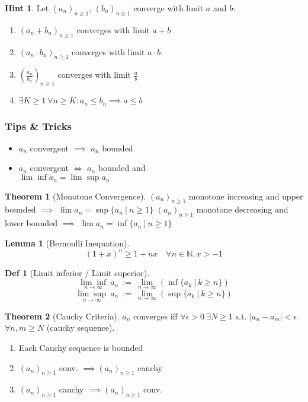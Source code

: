 \documentclass[a4paper, 10pt]{article}
\newtheorem*{lemma}{Lemma}
\theoremstyle{definition}
\newtheorem*{definition}{Def}
\newtheorem*{note_wrapper}{Hint}
\theoremstyle{named}
\newtheorem*{ntheorem_wrapper}{Theorem}
\newenvironment{ntheorem}%
    {\begin{mdframed}[style=important]\begin{ntheorem_wrapper}}%
    {\end{ntheorem_wrapper}\end{mdframed}}
\newenvironment{note}%
    {\begin{mdframed}[style=trick]\begin{note_wrapper}}%
    {\end{note_wrapper}\end{mdframed}}
\newcommand{\N}{\mathbb{N}}
\begin{document}
\begin{note}
    Let $(a_n)_{n\geq1}$, $(b_n)_{n\geq1}$ converge with limit $a$ and $b$:
    \begin{enumerate}
        \item $(a_n + b_n)_{n\geq1}$ converges with limit $a + b$
        \item $(a_n \cdot b_n)_{n\geq1}$ converges with limit $a \cdot b$.
        \item $(\frac{a_n}{b_n})_{n\geq1}$ converges with limit $\frac{a}{b}$
        \item $\exists K \geq 1 \ \forall n \geq K: a_n \leq b_n \implies a \leq b$
    \end{enumerate}
\end{note}

\subsubsection{Tips \& Tricks}
\begin{itemize}
    \item $a_n$ convergent $\implies$ $a_n$ bounded
    \item $a_n$ convergent $\iff$ $a_n$ bounded and \\ 
    $\lim\inf a_n = \lim\sup a_n$
\end{itemize}

\begin{ntheorem}[Monotone Convergence]
    $(a_n)_{n \geq 1}$ monotone increasing and upper bounded $\implies$ $\lim a_n = \sup\{a_n \ | \ n\geq 1\}$ \newline
    $(a_n)_{n \geq 1}$ monotone decreasing and lower bounded $\implies$ $\lim a_n = \inf\{a_n \ | \ n\geq 1\}$
\end{ntheorem}

\begin{lemma}[Bernoulli Inequation]
    $$(1 + x)^n \geq 1 + nx \quad \forall n \in \N, x > -1$$
\end{lemma}

\begin{definition}[Limit inferior / Limit superior]
    $$\underset{n\to\infty}{\lim\inf} \ a_n \ := \ \lim_{n\to\infty} (\inf \{a_k \ | \ k \geq n\})$$
    $$\underset{n\to\infty}{\lim\sup} \ a_n \ := \ \lim_{n\to\infty} (\sup \{a_k \ | \ k \geq n\})$$
\end{definition}

\begin{ntheorem}[Cauchy Criteria]
    $a_n$ converges iff $\forall \epsilon > 0 \ \exists N \geq 1$ s.t. $|a_n - a_m| < \epsilon$ $\forall n,m \geq N$ (cauchy sequence).
    \begin{enumerate}[label=(\roman*)]
        \item Each Cauchy sequence is bounded
        \item $(a_n)_{n \geq 1}$ conv. $\implies (a_n)_{n \geq 1}$ cauchy
        \item $(a_n)_{n \geq 1}$ cauchy $\implies (a_n)_{n \geq 1}$ conv.
    \end{enumerate}
\end{ntheorem}
\end{document}
